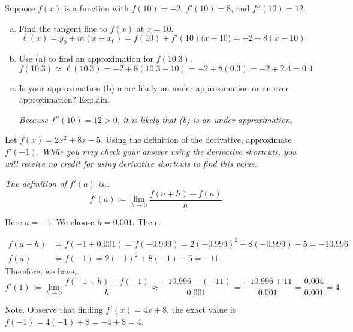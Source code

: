 \documentclass[12pt,letterpaper]{exam}
\begin{document}
\begin{questions}
\question[8] Suppose $f(x)$ is a function with $f(10)= -2$, $f'(10)= 8$, and $f''(10)= 12$. 
	\begin{enumerate}[(a)]
	\item Find the tangent line to $f(x)$ at $x= 10$. \pspace
		\[
		\ell(x)= y_0 + m(x - x_0)= f(10) + f'(10) \big(x - 10 \big)= -2 + 8(x - 10)
		\] \pvspace{0.35cm}
	
	\item Use (a) to find an approximation for $f(10.3)$. \pvspace{0.4cm}
		\[
		f(10.3) \approx \ell(10.3)= -2 + 8(10.3 - 10)= -2 + 8(0.3)= -2 + 2.4= 0.4 
		\] \pvspace{0.45cm}
	\item Is your approximation (b) more likely an under-approximation or an over-approximation? Explain. \pspace
	
	{\itshape Because $f''(10)= 12 > 0$, it is likely that (b) is an under-approximation.}
	\end{enumerate}



\newpage
\question[7] Let $f(x)= 2x^2 + 8x - 5$. Using the definition of the derivative, approximate $f'(-1)$. {\itshape While you may check your answer using the derivative shortcuts, you will receive no credit for using derivative shortcuts to find this value.} \pspace

{\itshape \tsol The definition of $f'(a)$ is\dots
	\[
	f'(a):= \lim_{h \to 0} \dfrac{f(a + h) - f(a)}{h}
	\] \par
Here $a= -1$. We choose $h= 0.001$. Then\dots \par
	\[
	\begin{aligned}
	f(a + h)&= f(-1 + 0.001)= f(-0.999)= 2(-0.999)^2 + 8(-0.999) - 5= -10.996 \\[0.3cm]
	f(a)&= f(-1)= 2(-1)^2 + 8(-1) - 5= -11 
	\end{aligned}
	\] \pspace
Therefore, we have\dots
	\[
	f'(1):= \lim_{h \to 0} \dfrac{f(-1 + h) - f(-1)}{h} \approx \dfrac{-10.996 - (-11)}{0.001}= \dfrac{-10.996 + 11}{0.001}= \dfrac{0.004}{0.001}= 4
	\] \vfill

{\small Note. Observe that finding $f'(x)= 4x + 8$, the exact value is $f(-1)= 4(-1) + 8= -4 + 8= 4$.}
}

\end{questions}
\end{document}
